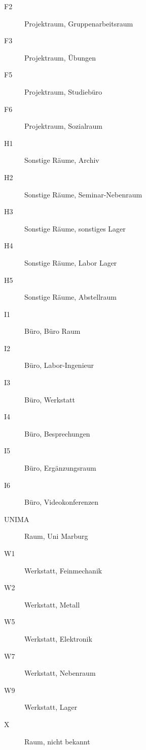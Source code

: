 \documentclass[]{report}
\begin{document}
\begin{appendices}
\begin{description}
	\item[F2]	Projektraum, Gruppenarbeitsraum
	\item[F3]	Projektraum, Übungen
	\item[F5]	Projektraum, Studiebüro
	\item[F6]	Projektraum, Sozialraum
	\item[H1]	Sonstige Räume, Archiv
	\item[H2]	Sonstige Räume, Seminar-Nebenraum
	\item[H3]	Sonstige Räume, sonstiges Lager
	\item[H4]	Sonstige Räume, Labor Lager
	\item[H5]	Sonstige Räume, Abstellraum
	\item[I1]	Büro, Büro	Raum
	\item[I2]	Büro, Labor-Ingenieur
	\item[I3]	Büro, Werkstatt
	\item[I4]	Büro, Besprechungen
	\item[I5]	Büro, Ergänzungsraum
	\item[I6]	Büro, Videokonferenzen
	\item[UNIMA]	Raum, Uni Marburg
	\item[W1]	Werkstatt, Feinmechanik
	\item[W2]	Werkstatt, Metall
	\item[W5]	Werkstatt, Elektronik
	\item[W7]	Werkstatt, Nebenraum
	\item[W9]	Werkstatt, Lager
	\item[X]	Raum, nicht bekannt
\end{description}


\end{appendices}
\end{document}
